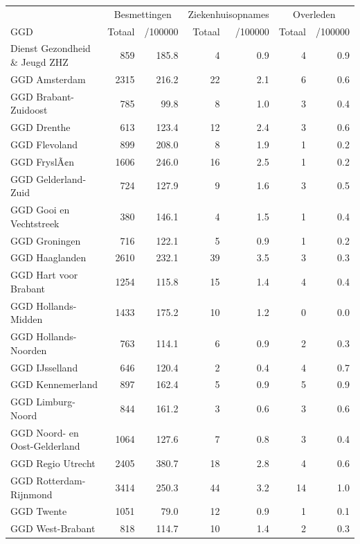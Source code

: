 \documentclass[
  english,
  man,floatsintext]{apa6}
\begin{document}
\begin{table}
\centering\begingroup\fontsize{10}{12}\selectfont

\begin{threeparttable}
\begin{tabular}{lrrrrrr}
\toprule
\multicolumn{1}{c}{ } & \multicolumn{2}{c}{Besmettingen} & \multicolumn{2}{c}{Ziekenhuisopnames} & \multicolumn{2}{c}{Overleden} \\
\cmidrule(l{3pt}r{3pt}){2-3} \cmidrule(l{3pt}r{3pt}){4-5} \cmidrule(l{3pt}r{3pt}){6-7}
GGD & Totaal & /100000 & Totaal & /100000 & Totaal & /100000\\
\midrule
Dienst Gezondheid \& Jeugd ZHZ & 859 & 185.8 & 4 & 0.9 & 4 & 0.9\\
GGD Amsterdam & 2315 & 216.2 & 22 & 2.1 & 6 & 0.6\\
GGD Brabant-Zuidoost & 785 & 99.8 & 8 & 1.0 & 3 & 0.4\\
GGD Drenthe & 613 & 123.4 & 12 & 2.4 & 3 & 0.6\\
GGD Flevoland & 899 & 208.0 & 8 & 1.9 & 1 & 0.2\\
GGD FryslÃ¢n & 1606 & 246.0 & 16 & 2.5 & 1 & 0.2\\
GGD Gelderland-Zuid & 724 & 127.9 & 9 & 1.6 & 3 & 0.5\\
GGD Gooi en Vechtstreek & 380 & 146.1 & 4 & 1.5 & 1 & 0.4\\
GGD Groningen & 716 & 122.1 & 5 & 0.9 & 1 & 0.2\\
GGD Haaglanden & 2610 & 232.1 & 39 & 3.5 & 3 & 0.3\\
GGD Hart voor Brabant & 1254 & 115.8 & 15 & 1.4 & 4 & 0.4\\
GGD Hollands-Midden & 1433 & 175.2 & 10 & 1.2 & 0 & 0.0\\
GGD Hollands-Noorden & 763 & 114.1 & 6 & 0.9 & 2 & 0.3\\
GGD IJsselland & 646 & 120.4 & 2 & 0.4 & 4 & 0.7\\
GGD Kennemerland & 897 & 162.4 & 5 & 0.9 & 5 & 0.9\\
GGD Limburg-Noord & 844 & 161.2 & 3 & 0.6 & 3 & 0.6\\
GGD Noord- en Oost-Gelderland & 1064 & 127.6 & 7 & 0.8 & 3 & 0.4\\
GGD Regio Utrecht & 2405 & 380.7 & 18 & 2.8 & 4 & 0.6\\
GGD Rotterdam-Rijnmond & 3414 & 250.3 & 44 & 3.2 & 14 & 1.0\\
GGD Twente & 1051 & 79.0 & 12 & 0.9 & 1 & 0.1\\
GGD West-Brabant & 818 & 114.7 & 10 & 1.4 & 2 & 0.3\\

\end{tabular}
\end{threeparttable}
\end{table}
\end{document}
